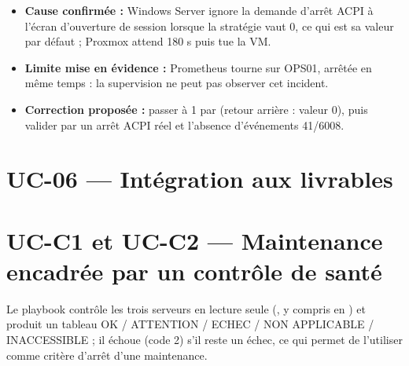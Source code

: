 \begin{itemize}
  \item \textbf{Cause confirmée :} Windows Server ignore la demande d'arrêt ACPI à l'écran d'ouverture
        de session lorsque la stratégie  vaut 0, ce qui est sa valeur par
        défaut ; Proxmox attend 180 s puis tue la VM.
  \item \textbf{Limite mise en évidence :} Prometheus tourne sur OPS01, arrêtée en même temps : la
        supervision ne peut pas observer cet incident.
  \item \textbf{Correction proposée :} passer  à 1 par 
        (retour arrière : valeur 0), puis valider par un arrêt ACPI réel et l'absence d'événements 41/6008.
\end{itemize}


\section{UC-06 — Intégration aux livrables}



\section{UC-C1 et UC-C2 — Maintenance encadrée par un contrôle de santé}

Le playbook  contrôle les trois serveurs en lecture seule
(, y compris en ) et produit un tableau OK / ATTENTION / ECHEC / NON
APPLICABLE / INACCESSIBLE ; il échoue (code 2) s'il reste un échec, ce qui permet de l'utiliser
comme critère d'arrêt d'une maintenance.


